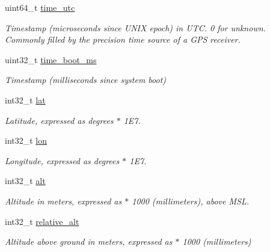 \begin{DoxyCompactItemize}
\item 
uint64\+\_\+t \hyperlink{struct____mavlink__global__position__int__cov__t_af33a529c45f0078ac50c0af3d6fcc5c9}{time\+\_\+utc}
\begin{DoxyCompactList}\small\item\em Timestamp (microseconds since U\+N\+I\+X epoch) in U\+T\+C. 0 for unknown. Commonly filled by the precision time source of a G\+P\+S receiver. \end{DoxyCompactList}\item 
uint32\+\_\+t \hyperlink{struct____mavlink__global__position__int__cov__t_acf45c019c88de59568fb8c590c6b59e8}{time\+\_\+boot\+\_\+ms}
\begin{DoxyCompactList}\small\item\em Timestamp (milliseconds since system boot) \end{DoxyCompactList}\item 
int32\+\_\+t \hyperlink{struct____mavlink__global__position__int__cov__t_a4c06e1a0f8238fe546a9b4c570839c4e}{lat}
\begin{DoxyCompactList}\small\item\em Latitude, expressed as degrees $\ast$ 1\+E7. \end{DoxyCompactList}\item 
int32\+\_\+t \hyperlink{struct____mavlink__global__position__int__cov__t_adfaec1cf67447f814898e180afd44434}{lon}
\begin{DoxyCompactList}\small\item\em Longitude, expressed as degrees $\ast$ 1\+E7. \end{DoxyCompactList}\item 
int32\+\_\+t \hyperlink{struct____mavlink__global__position__int__cov__t_abd44c2ddd64fb85dc923a847bd9f64fa}{alt}
\begin{DoxyCompactList}\small\item\em Altitude in meters, expressed as $\ast$ 1000 (millimeters), above M\+S\+L. \end{DoxyCompactList}\item 
int32\+\_\+t \hyperlink{struct____mavlink__global__position__int__cov__t_aabade455b181c4469b3e464d1d97185c}{relative\+\_\+alt}
\begin{DoxyCompactList}\small\item\em Altitude above ground in meters, expressed as $\ast$ 1000 (millimeters) \end{DoxyCompactList}\item 

\end{DoxyCompactItemize}
